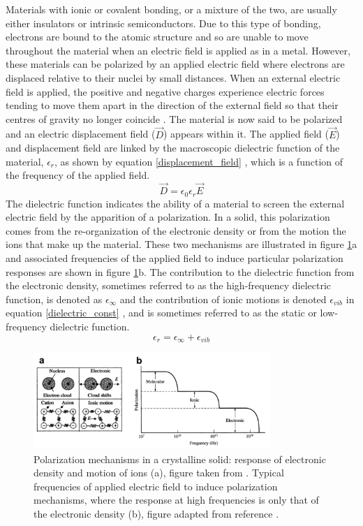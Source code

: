 Materials with ionic or covalent bonding, or a mixture of the two, are usually either insulators or intrinsic semiconductors. Due to this type of bonding, electrons are bound to the atomic structure and so are unable to move throughout the material when an electric field is applied as in a metal. However, these materials can be polarized by an applied electric field where electrons are displaced relative to their nuclei by small distances. When an external electric field is applied, the positive and negative charges experience electric forces tending to move them apart in the direction of the external field so that their centres of gravity no longer coincide \cite{dielectric2}. The material is now said to be polarized and an electric displacement field ($\vec{D}$) appears within it. The applied field ($\vec{E}$) and displacement field are linked by the macroscopic dielectric function of the material, $\epsilon_r$, as shown by equation \ref{displacement_field} \cite{dielectric_const1}, which is a function of the frequency of the applied field.
\begin{equation} \label{displacement_field}
\vec{D} = \epsilon_0 \epsilon_r \vec{E}
\end{equation}
The dielectric function indicates the ability of a material to screen the external electric field by the apparition of a polarization. In a solid, this polarization comes from the re-organization of the electronic density or from the motion the ions that make up the material. These two mechanisms are illustrated in figure \ref{dielectric}a and associated frequencies of the applied field to induce particular polarization responses are shown in figure \ref{dielectric}b. The contribution to the dielectric function from the electronic density, sometimes referred to as the high-frequency dielectric function, is denoted as $\epsilon_{\infty}$ and the contribution of ionic motions is denoted $\epsilon_{vib}$ in equation \ref{dielectric_const} \cite{dielectric_const1}, and is sometimes referred to as the static or low-frequency dielectric function.
\begin{equation} \label{dielectric_const}
\epsilon_{r} = \epsilon_{\infty} + \epsilon_{vib}
\end{equation}

\begin{figure}[h!]
  \centering
    \includegraphics[width=0.8\textwidth]{figures/dielectric.png}
    \caption{Polarization mechanisms in a crystalline solid: response of electronic density and motion of ions (a), figure taken from . Typical frequencies of applied electric field to induce polarization mechanisms, where the response at high frequencies is only that of the electronic density (b), figure adapted from reference .}
  \label{dielectric}
\end{figure}

